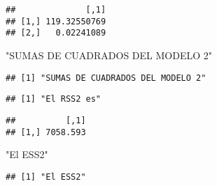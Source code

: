 \documentclass[
]{article}
\newenvironment{Shaded}{\begin{snugshade}}{\end{snugshade}}
\newcommand{\DataTypeTok}[1]{\textcolor[rgb]{0.13,0.29,0.53}{#1}}
\newcommand{\KeywordTok}[1]{\textcolor[rgb]{0.13,0.29,0.53}{\textbf{#1}}}
\newcommand{\NormalTok}[1]{#1}
\newcommand{\OperatorTok}[1]{\textcolor[rgb]{0.81,0.36,0.00}{\textbf{#1}}}
\newcommand{\StringTok}[1]{\textcolor[rgb]{0.31,0.60,0.02}{#1}}
\begin{document}
\begin{Shaded}
\end{Shaded}

\begin{verbatim}
##              [,1]
## [1,] 119.32550769
## [2,]   0.02241089
\end{verbatim}

\begin{Shaded}
\begin{Highlighting}[]
\StringTok{"SUMAS DE CUADRADOS DEL MODELO 2"}
\end{Highlighting}
\end{Shaded}

\begin{verbatim}
## [1] "SUMAS DE CUADRADOS DEL MODELO 2"
\end{verbatim}

\begin{Shaded}
\end{Shaded}

\begin{verbatim}
## [1] "El RSS2 es"
\end{verbatim}

\begin{Shaded}
\end{Shaded}

\begin{verbatim}
##          [,1]
## [1,] 7058.593
\end{verbatim}

\begin{Shaded}
\begin{Highlighting}[]
\StringTok{"El ESS2"}
\end{Highlighting}
\end{Shaded}

\begin{verbatim}
## [1] "El ESS2"
\end{verbatim}
\end{document}
